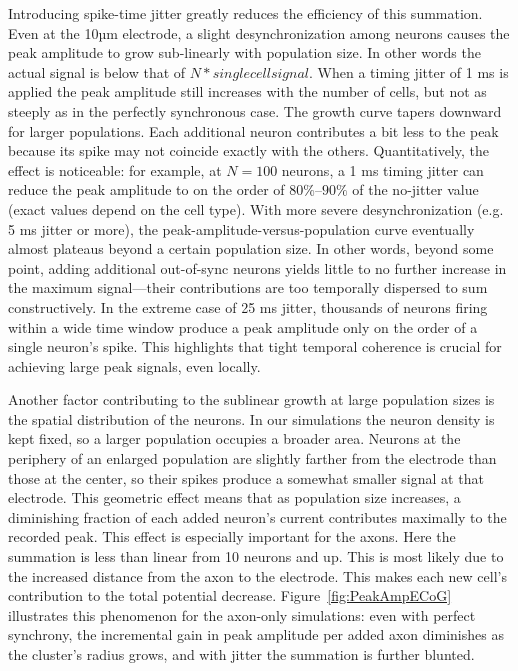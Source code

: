 \documentclass[final, a4paper,masters,en,listoffigures,listoftables,norwegiandates]{NMBU}
\begin{document}
Introducing spike-time jitter greatly reduces the efficiency of this summation. Even at the 10µm electrode, a slight desynchronization among neurons causes the peak amplitude to grow sub-linearly with population size. In other words the actual signal is below that of $N * single cell signal$. When a timing jitter of 1 ms is applied the peak amplitude still increases with the number of cells, but not as steeply as in the perfectly synchronous case. The growth curve tapers downward for larger populations. Each additional neuron contributes a bit less to the peak because its spike may not coincide exactly with the others. Quantitatively, the effect is noticeable: for example, at $N=100$ neurons, a 1 ms timing jitter can reduce the peak amplitude to on the order of $80\%$–$90\%$ of the no-jitter value (exact values depend on the cell type). With more severe desynchronization (e.g. 5 ms jitter or more), the peak-amplitude-versus-population curve eventually almost plateaus beyond a certain population size. In other words, beyond some point, adding additional out-of-sync neurons yields little to no further increase in the maximum signal—their contributions are too temporally dispersed to sum constructively. In the extreme case of 25 ms jitter, thousands of neurons firing within a wide time window produce a peak amplitude only on the order of a single neuron’s spike. This highlights that tight temporal coherence is crucial for achieving large peak signals, even locally.

Another factor contributing to the sublinear growth at large population sizes is the spatial distribution of the neurons. In our simulations the neuron density is kept fixed, so a larger population occupies a broader area. Neurons at the periphery of an enlarged population are slightly farther from the electrode than those at the center, so their spikes produce a somewhat smaller signal at that electrode. This geometric effect means that as population size increases, a diminishing fraction of each added neuron’s current contributes maximally to the recorded peak. This effect is especially important for the axons. Here the summation is less than linear from 10 neurons and up. This is most likely due to the increased distance from the axon to the electrode. This makes each new cell's contribution to the total potential decrease. Figure~\ref{fig:PeakAmpECoG} illustrates this phenomenon for the axon-only simulations: even with perfect synchrony, the incremental gain in peak amplitude per added axon diminishes as the cluster’s radius grows, and with jitter the summation is further blunted. 
\end{document}
